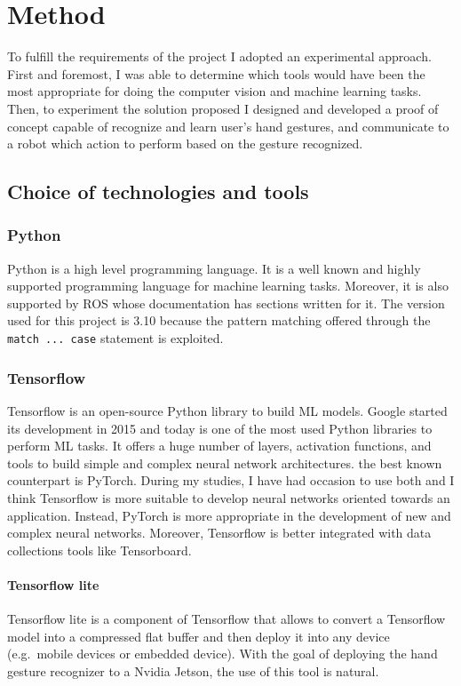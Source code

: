 \documentclass[../thesis.tex]{subfiles}
\begin{document}
\chapter{Method}\label{cap:methods}
To fulfill the requirements of the project I adopted an experimental approach. First and foremost, I was able to determine which tools would have been the most appropriate for doing the computer vision and machine learning tasks. Then, to experiment the solution proposed I designed and developed a proof of concept capable of recognize and learn user's hand gestures, and communicate to a robot which action to perform based on the gesture recognized.
\section{Choice of technologies and tools}\label{sec:technologies_and_tolls}
\subsection{Python}
Python is a high level programming language. It is a well known and highly supported programming language for machine learning tasks. Moreover, it is also supported by \acrshort{ROS} whose documentation has sections written for it. The version used for this project is 3.10 because the pattern matching offered through the \texttt{match ... case} statement is exploited.

\subsection{Tensorflow}
Tensorflow is an open-source Python library to build \acrshort{ML} models. Google started its development in 2015 and today is one of the most used Python libraries to perform \acrshort{ML} tasks. It offers a huge number of layers, activation functions, and tools to build simple and complex neural network architectures. the best known counterpart is PyTorch. During my studies, I have had occasion to use both and I think Tensorflow is more suitable to develop neural networks oriented towards an application. Instead, PyTorch is more appropriate in the development of new and complex neural networks. Moreover, Tensorflow is better integrated with data collections tools like Tensorboard.

\subsubsection{Tensorflow lite}
Tensorflow lite is a component of Tensorflow that allows to convert a Tensorflow model into a compressed flat buffer and then deploy it into any device (e.g.\ mobile devices or embedded device). With the goal of deploying the hand gesture recognizer to a Nvidia Jetson, the use of this tool is natural.
\end{document}

